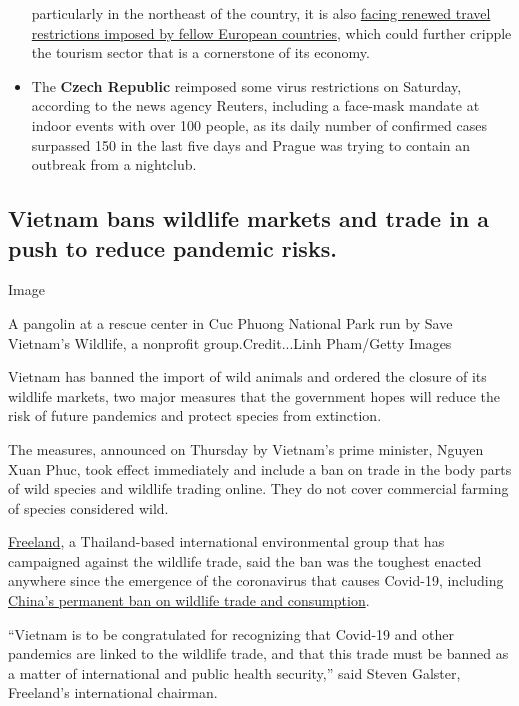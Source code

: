 \begin{itemize}
  particularly in the northeast of the country, it is also
  \href{https://www.nytimes3xbfgragh.onion/2020/07/23/world/europe/spain-coronavirus-reopening.html}{facing
  renewed travel restrictions imposed by fellow European countries},
  which could further cripple the tourism sector that is a cornerstone
  of its economy.
\item
  The \textbf{Czech Republic} reimposed some virus restrictions on
  Saturday, according to the news agency Reuters, including a face-mask
  mandate at indoor events with over 100 people, as its daily number of
  confirmed cases surpassed 150 in the last five days and Prague was
  trying to contain an outbreak from a nightclub.
\end{itemize}

\hypertarget{vietnam-bans-wildlife-markets-and-trade-in-a-push-to-reduce-pandemic-risks}{%
\subsection{Vietnam bans wildlife markets and trade in a push to reduce
pandemic
risks.}\label{vietnam-bans-wildlife-markets-and-trade-in-a-push-to-reduce-pandemic-risks}}

Image

A pangolin at a rescue center in Cuc Phuong National Park run by Save
Vietnam's Wildlife, a nonprofit group.Credit...Linh Pham/Getty Images

Vietnam has banned the import of wild animals and ordered the closure of
its wildlife markets, two major measures that the government hopes will
reduce the risk of future pandemics and protect species from extinction.

The measures, announced on Thursday by Vietnam's prime minister, Nguyen
Xuan Phuc, took effect immediately and include a ban on trade in the
body parts of wild species and wildlife trading online. They do not
cover commercial farming of species considered wild.

\href{https://www.youtube.com/watch?v=-rVD9dkT-yc\&t=1s}{Freeland}, a
Thailand-based international environmental group that has campaigned
against the wildlife trade, said the ban was the toughest enacted
anywhere since the emergence of the coronavirus that causes Covid-19,
including
\href{https://www.nytimes3xbfgragh.onion/2020/02/27/science/coronavirus-pangolin-wildlife-ban-china.html}{China's
permanent ban on wildlife trade and consumption}.

``Vietnam is to be congratulated for recognizing that Covid-19 and other
pandemics are linked to the wildlife trade, and that this trade must be
banned as a matter of international and public health security,'' said
Steven Galster, Freeland's international chairman.

